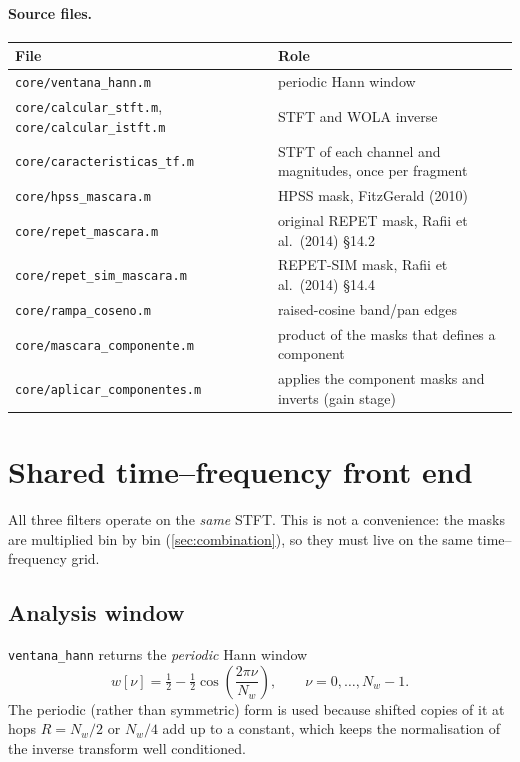 \documentclass[11pt,a4paper]{article}
\newcommand{\code}[1]{\texttt{#1}}
\begin{document}
\paragraph{Source files.}
\begin{center}
\begin{tabularx}{\linewidth}{@{}lL@{}}
\toprule
File & Role \\
\midrule
\code{core/ventana\_hann.m} & periodic Hann window \\
\code{core/calcular\_stft.m}, \code{core/calcular\_istft.m} & STFT and WOLA inverse \\
\code{core/caracteristicas\_tf.m} & STFT of each channel and magnitudes, once per fragment \\
\code{core/hpss\_mascara.m} & HPSS mask, FitzGerald (2010) \\
\code{core/repet\_mascara.m} & original REPET mask, Rafii et al.\ (2014) \S14.2 \\
\code{core/repet\_sim\_mascara.m} & REPET-SIM mask, Rafii et al.\ (2014) \S14.4 \\
\code{core/rampa\_coseno.m} & raised-cosine band/pan edges \\
\code{core/mascara\_componente.m} & product of the masks that defines a component \\
\code{core/aplicar\_componentes.m} & applies the component masks and inverts (gain stage) \\
\bottomrule
\end{tabularx}
\end{center}

\section{Shared time--frequency front end}
\label{sec:stft}

All three filters operate on the \emph{same} STFT. This is not a
convenience: the masks are multiplied bin by bin
(\cref{sec:combination}), so they must live on the same time--frequency
grid.

\subsection{Analysis window}
\code{ventana\_hann} returns the \emph{periodic} Hann window
\begin{equation}
  w[\nu] = \tfrac12 - \tfrac12\cos\!\left(\frac{2\pi \nu}{N_w}\right),
  \qquad \nu = 0,\dots,N_w-1 .
\end{equation}
The periodic (rather than symmetric) form is used because shifted copies
of it at hops $R=N_w/2$ or $N_w/4$ add up to a constant, which keeps the
normalisation of the inverse transform well conditioned.
\end{document}
